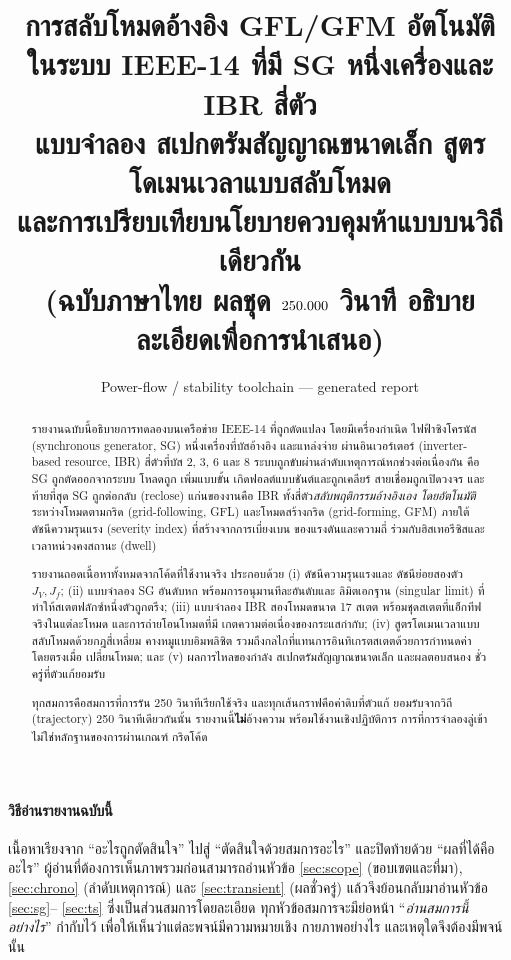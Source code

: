 \documentclass[12pt,a4paper]{article}
\title{\bfseries การสลับโหมดอ้างอิง GFL/GFM อัตโนมัติ\\
ในระบบ IEEE-14 ที่มี SG หนึ่งเครื่องและ IBR สี่ตัว\\[2pt]
\large แบบจำลอง สเปกตรัมสัญญาณขนาดเล็ก สูตรโดเมนเวลาแบบสลับโหมด\\
และการเปรียบเทียบนโยบายควบคุมห้าแบบบนวิถีเดียวกัน\\[2pt]
\normalsize (ฉบับภาษาไทย ผลชุด $250.000$ วินาที อธิบายละเอียดเพื่อการนำเสนอ)}
\author{Power-flow / stability toolchain --- generated report}
\date{}
\begin{document}
\maketitle
\thispagestyle{fancy}

\begin{abstract}
\noindent
รายงานฉบับนี้อธิบายการทดลองบนเครือข่าย IEEE-14 ที่ถูกดัดแปลง โดยมีเครื่องกำเนิด
ไฟฟ้าซิงโครนัส (synchronous generator, SG) หนึ่งเครื่องที่บัสอ้างอิง และแหล่งจ่าย
ผ่านอินเวอร์เตอร์ (inverter-based resource, IBR) สี่ตัวที่บัส 2, 3, 6 และ 8
ระบบถูกขับผ่านลำดับเหตุการณ์หกช่วงต่อเนื่องกัน คือ SG ถูกตัดออกจากระบบ โหลดถูก
เพิ่มแบบขั้น เกิดฟอลต์แบบชันต์และถูกเคลียร์ สายเชื่อมถูกเปิดวงจร และท้ายที่สุด SG
ถูกต่อกลับ (reclose) แก่นของงานคือ IBR ทั้งสี่ตัว\emph{สลับพฤติกรรมอ้างอิงเอง
โดยอัตโนมัติ}ระหว่างโหมดตามกริด (grid-following, GFL) และโหมดสร้างกริด
(grid-forming, GFM) ภายใต้ดัชนีความรุนแรง (severity index) ที่สร้างจากการเบี่ยงเบน
ของแรงดันและความถี่ ร่วมกับฮิสเทอรีซิสและเวลาหน่วงคงสถานะ (dwell)

รายงานถอดเนื้อหาทั้งหมดจากโค้ดที่ใช้งานจริง ประกอบด้วย (i) ดัชนีความรุนแรงและ
ดัชนีย่อยสองตัว $J_V,J_f$; (ii) แบบจำลอง SG อันดับหก พร้อมการอนุมานทีละอันดับและ
ลิมิตเอกฐาน (singular limit) ที่ทำให้สเตตฟลักซ์หนึ่งตัวถูกตรึง; (iii) แบบจำลอง IBR
สองโหมดขนาด 17 สเตต พร้อมชุดสเตตที่แอ็กทีฟจริงในแต่ละโหมด และการถ่ายโอนโหมดที่มี
เกตความต่อเนื่องของกระแสกำกับ; (iv) สูตรโดเมนเวลาแบบสลับโหมดด้วยกฎสี่เหลี่ยม
คางหมูแบบอิมพลิซิต รวมถึงกลไกที่แทนการอินทิเกรตสเตตด้วยการกำหนดค่าโดยตรงเมื่อ
เปลี่ยนโหมด; และ (v) ผลการไหลของกำลัง สเปกตรัมสัญญาณขนาดเล็ก และผลตอบสนอง
ชั่วครู่ที่ตัวแก้ยอมรับ

ทุกสมการคือสมการที่การรัน 250 วินาทีเรียกใช้จริง และทุกเส้นกราฟคือค่าดิบที่ตัวแก้
ยอมรับจากวิถี (trajectory) 250 วินาทีเดียวกันนั้น รายงานนี้\textbf{ไม่}อ้างความ
พร้อมใช้งานเชิงปฏิบัติการ การที่การจำลองลู่เข้าไม่ใช่หลักฐานของการผ่านเกณฑ์
กริดโค้ด
\end{abstract}

\paragraph{วิธีอ่านรายงานฉบับนี้}
เนื้อหาเรียงจาก ``อะไรถูกตัดสินใจ'' ไปสู่ ``ตัดสินใจด้วยสมการอะไร'' และปิดท้ายด้วย
``ผลที่ได้คืออะไร'' ผู้อ่านที่ต้องการเห็นภาพรวมก่อนสามารถอ่านหัวข้อ
\ref{sec:scope} (ขอบเขตและที่มา), \ref{sec:chrono} (ลำดับเหตุการณ์) และ
\ref{sec:transient} (ผลชั่วครู่) แล้วจึงย้อนกลับมาอ่านหัวข้อ \ref{sec:sg}--%
\ref{sec:ts} ซึ่งเป็นส่วนสมการโดยละเอียด ทุกหัวข้อสมการจะมีย่อหน้า
``\emph{อ่านสมการนี้อย่างไร}'' กำกับไว้ เพื่อให้เห็นว่าแต่ละพจน์มีความหมายเชิง
กายภาพอย่างไร และเหตุใดจึงต้องมีพจน์นั้น
\end{document}
